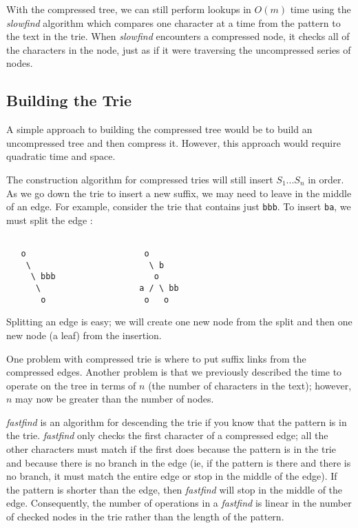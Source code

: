 \documentclass{article}
\begin{document}
With the compressed tree, we can still perform lookups in $O(m)$ time
using the \emph{slowfind} algorithm which compares one character at a
time from the pattern to the text in the trie.  When \emph{slowfind}
encounters a compressed node, it checks all of the characters in the
node, just as if it were traversing the uncompressed series of nodes.

\subsection{Building the Trie}

A simple approach to building the compressed tree would be to build an
uncompressed tree and then compress it.  However, this approach would
require quadratic time and space.

The construction algorithm for compressed tries will still insert $S_1
... S_n$ in order.  As we go down the trie to insert a new suffix, we
may need to leave in the middle of an edge.  For example, consider the
trie that contains just \texttt{bbb}.  To insert \texttt{ba}, we must
split the edge :
\begin{verbatim}

   o                        o
    \                        \ b
     \ bbb                    o
      \                    a / \ bb
       o                    o   o
\end{verbatim}
Splitting an edge is easy; we will create one new node from the split
and then one new node (a leaf) from the insertion.  

One problem with compressed trie is where to put suffix links from the
compressed edges.  Another problem is that we previously described the
time to operate on the tree in terms of $n$ (the number of characters in
the text); however, $n$ may now be greater than the number of nodes. 

\emph{fastfind} is an algorithm for descending the trie if you know
that the pattern is in the trie.  \emph{fastfind} only checks the
first character of a compressed edge; all the other characters must
match if the first does because the pattern is in the trie and because
there is no branch in the edge (ie, if the pattern is there and there is
no branch, it must match the entire edge or stop in the middle of the
edge).  If the pattern is shorter than the edge, then \emph{fastfind}
will stop in the middle of the edge.  Consequently, the number of
operations in a \emph{fastfind} is linear in the number of checked
nodes in the trie rather than the length of the pattern.
\end{document}
